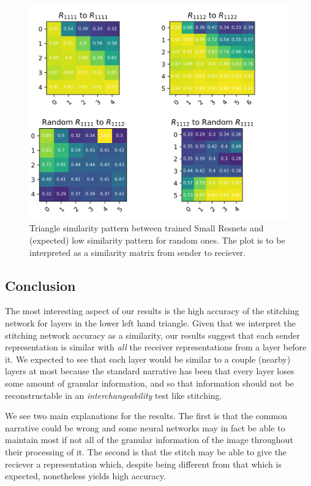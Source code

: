 \documentclass{article}
\begin{document}
\begin{center}
   \begin{figure}[H]
      \centering
      \includegraphics{tables.png}
      \caption{Triangle similarity pattern between trained Small Resnets and (expected) low similarity pattern for
      random ones. The plot is to be interpreted as a similarity matrix from sender to reciever.}
   \end{figure}
\end{center}

\subsection{Conclusion}
The most interesting aspect of our results is the high accuracy of the stitching network
for layers in the lower left hand triangle. Given that we interpret the stitching network accuracy
as a similarity, our results suggest that each sender representation is similar with \textit{all}
the receiver representations from a layer before it. We expected to see that each layer would be
similar to a couple (nearby) layers at most because the standard narrative has been that 
every layer loses some amount of granular information, and so that information should not be reconstructable
in an \textit{interchangeability} test like stitching.

We see two main explanations for the results. The first is that the common narrative could be wrong and some neural
networks may in fact be able to maintain most if not all of the granular information of the image throughout their
processing of it. The second is that the stitch may be able to give the reciever a representation which, despite being
different from that which is expected, nonetheless yields high accuracy.
\end{document}
